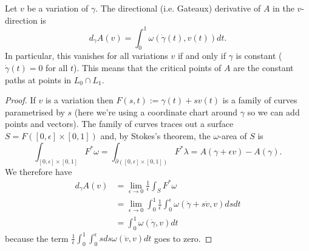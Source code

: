 \documentclass{amsart}
\begin{document}
\begin{Lemma}
Let $v$ be a variation of $\gamma$. The directional (i.e. Gateaux) derivative of $A$ in the $v$-direction is
\[d_{\gamma}A(v)=\int_0^1\omega(\dot{\gamma}(t),v(t))dt.\]
In particular, this vanishes for all variations $v$ if and only if $\gamma$ is constant ($\dot{\gamma}(t)=0$ for all $t$). This means that the critical points of $A$ are the constant paths at points in $L_0\cap L_1$.
\end{Lemma}
\begin{proof}
If $v$ is a variation then $F(s,t):=\gamma(t)+sv(t)$ is a family of curves parametrised by $s$ (here we're using a coordinate chart around $\gamma$ so we can add points and vectors). The family of curves traces out a surface $S=F([0,\epsilon]\times[0,1])$ and, by Stokes's theorem, the $\omega$-area of $S$ is
\[\int_{[0,\epsilon]\times[0,1]}F^*\omega=\int_{\partial([0,\epsilon]\times[0,1])}F^*\lambda=A(\gamma+\epsilon v)-A(\gamma).\]
We therefore have
\begin{align*}
  d_{\gamma}A(v)&=\lim_{\epsilon\to 0}\frac{1}{\epsilon}\int_SF^*\omega\\
  &=\lim_{\epsilon\to 0}\int_0^1\frac{1}{\epsilon}\int_0^{\epsilon}\omega(\dot{\gamma}+s\dot{v},v)ds dt\\
  &=\int_0^1\omega(\dot{\gamma},v)dt
\end{align*}
because the term $\frac{1}{\epsilon}\int_0^1\int_0^{\epsilon}sds\omega(\dot{v},v)dt$ goes to zero.
\end{proof}
\end{document}
